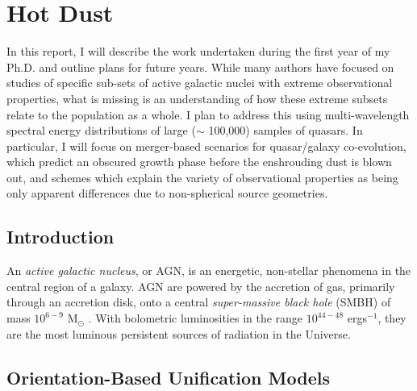\chapter{Hot Dust}\label{ch:hotdust} 





In this report, I will describe the work undertaken during the first year of my Ph.D. and outline plans for future years. While many authors have focused on studies of specific sub-sets of active galactic nuclei with extreme observational properties, what is missing is an understanding of how these extreme subsets relate to the population as a whole. I plan to address this using multi-wavelength spectral energy distributions of large ($\sim$ 100,000) samples of quasars. In particular, I will focus on merger-based scenarios for quasar/galaxy co-evolution, which predict an obscured growth phase before the enshrouding dust is blown out, and schemes which explain the variety of observational properties as being only apparent differences due to non-spherical source geometries. 

\section{Introduction}

An {\it active galactic nucleus}, or AGN, is an energetic, non-stellar phenomena in the central region of a galaxy. AGN are powered by the accretion of gas, primarily through an accretion disk, onto a central {\it super-massive black hole} (SMBH) of mass $10^{6 - 9}$ M$_\odot$ \citep{lynden-bell69}. With bolometric luminosities in the range $10^{44 - 48}$ ergs$^{-1}$, they are the most luminous persistent sources of radiation in the Universe. 

\section{Orientation-Based Unification Models}

